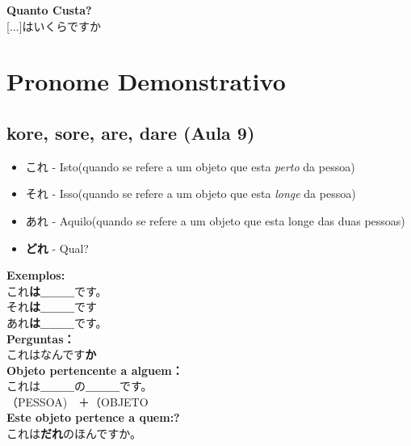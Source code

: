 \documentclass[a4paper, 12pt]{article}
\begin{document}
	
	\begin{CJK}{UTF8}{min}
		\Large
		\textbf{Quanto Custa?}\\
		\normalsize
		[...]はいくらですか
	\end{CJK}




\newpage
\section{Pronome Demonstrativo}
\subsection{kore, sore, are, dare (Aula 9)}
\begin{CJK}{UTF8}{min}

	\begin{itemize}
		\item これ - Isto(quando se refere a um objeto que esta \textit{perto} da pessoa)\\
		\item それ - Isso(quando se refere a um objeto que esta \textit{longe} da pessoa)\\
		\item あれ - Aquilo(quando se refere a um objeto que esta longe das duas pessoas)\\
		
		\item \textbf{どれ} - Qual?
		
	\end{itemize}
	
	\textbf{Exemplos:}\\
	これ\textbf{は}＿＿＿です。\\
	それ\textbf{は}＿＿＿です　\\
	あれ\textbf{は}＿＿＿です。\\
	
	\textbf{Perguntas：}\\
	これはなんです\textbf{か}\\
	
	
	
	\textbf{Objeto pertencente a alguem：}\\
	これは＿＿＿の＿＿＿です。\\（PESSOA)　＋（OBJETO \\
	
	\textbf{Este objeto pertence a quem:?}\\
	これは\textbf{だれ}のほんですか。
\end{CJK}
\end{document}
